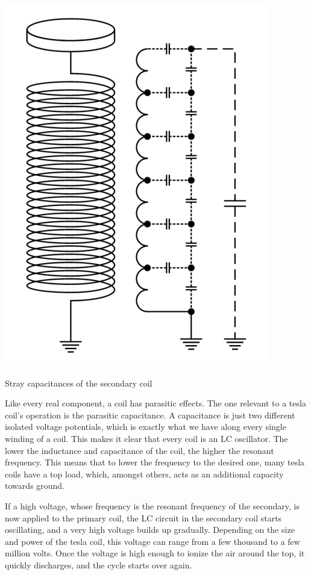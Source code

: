 \begin{marginfigure}[*-5]
\includegraphics[width=\textwidth]{simon/resources/teslaCoilStrayCapacitance.png}
\caption{Stray capacitances of the secondary coil}
\end{marginfigure}

Like every real component, a coil has parasitic effects. The one relevant to a tesla coil's operation is the parasitic capacitance. A capacitance is just two different isolated voltage potentials, which is exactly what we have along every single winding of a coil. This makes it clear that every coil is an LC oscillator. The lower the inductance and capacitance of the coil, the higher the resonant frequency. This means that to lower the frequency to the desired one, many tesla coils have a top load, which, amongst others, acts as an additional capacity towards ground.

If a high voltage, whose frequency is the resonant frequency of the secondary, is now applied to the primary coil, the LC circuit in the secondary coil starts oscillating, and a very high voltage builds up gradually. Depending on the size and power of the tesla coil, this voltage can range from a few thousand to a few million volts. Once the voltage is high enough to ionize the air around the top, it quickly discharges, and the cycle starts over again.

